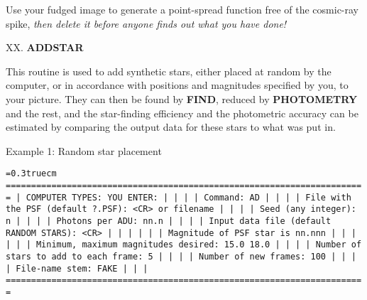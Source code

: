Use your fudged image to generate a point-spread function free of the
cosmic-ray spike, {\it then delete it before anyone finds out what you
have done!}

\vfill
\eject
\noindent XX.  {\bf ADDSTAR}

This routine is used to add synthetic stars, either placed at
random by the computer, or in accordance with positions and magnitudes
specified by you, to your picture. They can then be found by {\bf
FIND}, reduced by {\bf PHOTOMETRY} and the rest, and the star-finding
efficiency and the photometric accuracy can be estimated by comparing
the output data for these stars to what was put in. 

\bigskip

\noindent Example 1:  Random star placement

\bigskip
{\noindent\obeylines\obeyspaces\frenchspacing\tt\baselineskip=0.3truecm
=======================================================================
| COMPUTER TYPES:                                  YOU ENTER:         |
|                                                                     |
| Command:                                         AD                 |
|                                                                     |
|         File with the PSF (default ?.PSF):       <CR> or filename   |
|                                                                     |
|                        Seed (any integer):       n                  |
|                                                                     |
|                           Photons per ADU:       nn.n               |
|                                                                     |
|    Input data file (default RANDOM STARS):       <CR>               |
|                                                                     |
|                                                                     |
|               Magnitude of PSF star is nn.nnn                       |
|                                                                     |
|                                                                     |
|       Minimum, maximum magnitudes desired:       15.0 18.0          |
|                                                                     |
|      Number of stars to add to each frame:       5                  |
|                                                                     |
|                      Number of new frames:       100                |
|                                                                     |
|                            File-name stem:       FAKE               |
|                                                                     |
=======================================================================
}
\bigskip

